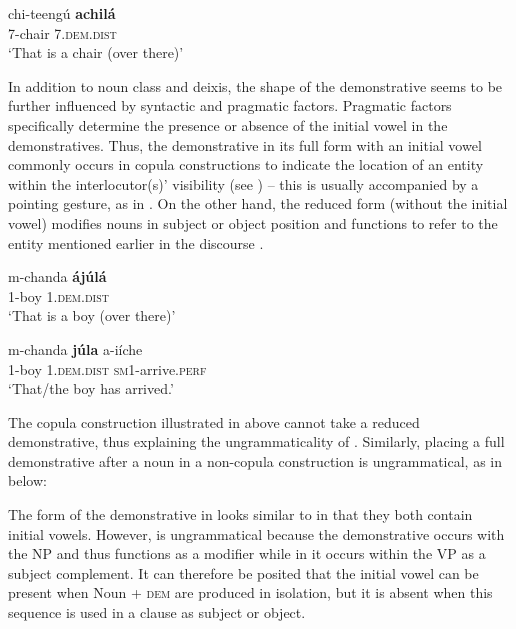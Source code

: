 \documentclass[output=paper,
            colorlinks, citecolor=brown
            ,draftmode
		  ]{langscibook}
\begin{document}
    \ex\label{ex:taji:7c} \gll  chi-teengú    \textbf{achilá}\\
      7-chair      7.\textsc{dem.dist}\\
     \glt ‘That is a chair (over there)’
    \z
\z

In addition to noun class and deixis, the shape of the demonstrative seems to be further influenced by syntactic and pragmatic factors. Pragmatic factors specifically determine the presence or absence of the initial vowel in the demonstratives. Thus, the demonstrative in its full form with an initial vowel commonly occurs in copula constructions to indicate the location of an entity within the interlocutor(s)’ visibility (see ) -- this is usually accompanied by a pointing gesture, as in . On the other hand, the reduced form (without the initial vowel) modifies nouns in subject or object position and functions to refer to the entity mentioned earlier in the discourse .

\ea%
    \label{ex:taji:8}
    \gll m-chanda      \textbf{ájúlá}\\
  1-boy            1.\textsc{dem.dist}    \\
  \glt ‘That is a boy (over there)’

\ex%
    \label{ex:taji:9}
    \gll m-chanda    \textbf{júla}                a-iíche\\
  1-boy    1.\textsc{dem.dist}      \textsc{sm1}-arrive.\textsc{perf}      \\
  \glt ‘That/the boy has arrived.’
\z

The copula construction illustrated in  above cannot take a reduced demonstrative, thus explaining the ungrammaticality of . Similarly, placing a full demonstrative after a noun in a non-copula construction is ungrammatical, as in  below:  

\label{ex:taji:10}

\label{ex:taji:11}
 \z

The form of the demonstrative in  looks similar to  in that they both contain initial vowels. However,  is ungrammatical because the demonstrative occurs with the NP and thus functions as a modifier while in  it occurs within the VP as a subject complement. It can therefore be posited that the initial vowel can be present when Noun + \textsc{dem} are produced in isolation, but it is absent when this sequence is used in a clause as subject or object. 
\end{document}
